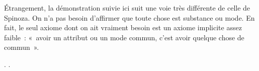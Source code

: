\documentclass[12pt]{report}
\begin{document}
Étrangement, la démonstration suivie ici suit une voie très
  différente de celle de Spinoza. On n'a pas besoin d'affirmer que toute
  chose est substance ou mode. En fait, le seul axiome dont on ait
  vraiment besoin est un axiome implicite assez faible : « avoir un
  attribut ou un mode commun, c'est avoir quelque chose de commun ». \begin{coqdoccode}
\coqdocemptyline
\coqdocnoindent
{}.\coqdoceol
\coqdocemptyline
\coqdocnoindent
{} .\coqdoceol
\end{coqdoccode}
\end{document}
